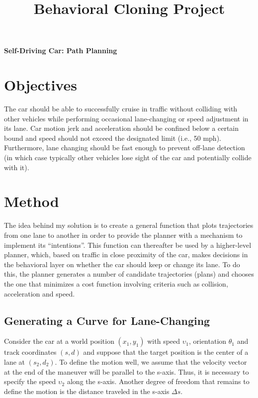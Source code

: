 \documentclass[12 pt]{article}
\title{Behavioral Cloning Project}
\begin{document}
	\begin{LARGE}
		 \centering 
		 {\bf Self-Driving Car: Path Planning}
		 
	\end{LARGE}
	
	\vspace{1 in}
	
	\section{Objectives}
	
	
	
	The car should be able to successfully cruise in traffic without colliding with other vehicles while performing occasional lane-changing or speed adjustment in its lane. Car motion jerk and acceleration should be confined below a certain bound and speed should not exceed the designated limit (i.e., 50 mph). Furthermore, lane changing should be fast enough to prevent off-lane detection (in which case typically other vehicles lose sight of the car and potentially collide with it). 
	
	\section{Method}
	\label{sect:calibration}
	
	The idea behind my solution is to create a general function that plots trajectories from one lane to another in order to provide the planner with a mechanism to implement its ``intentions''. This function can thereafter be used by a higher-level planner, which, based on traffic in close proximity of the car, makes decisions in the behavioral layer on whether the car should keep or change its lane. To do this, the planner generates a number of candidate trajectories (plans) and chooses the one that minimizes a cost function involving criteria such as collision, acceleration and speed. 
	\subsection{Generating a Curve for Lane-Changing}
	Consider the car at a world position $\left(x_1,y_1\right)$ with speed $\upsilon_1$, orientation $\theta_1$ and track coordinates $\left(s, d\right)$ and suppose that the target position is the center of a lane at $\left(s_2, d_2\right)$. To define the motion well, we assume that the velocity vector at the end of the maneuver will be parallel to the s-axis. Thus, it is necessary to specify the speed $\upsilon_2$ along the s-axis. Another degree of freedom that remains to define the motion is the distance traveled in the s-axis $\Delta s$.
	
\end{document}
